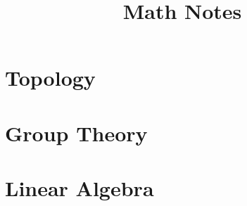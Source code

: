 \documentclass{article}
\title{Math Notes}
\begin{document}
\maketitle
\newpage
\tableofcontents
\newpage

\part{Topology}




\part{Group Theory}



\part{Linear Algebra}







\end{document}
